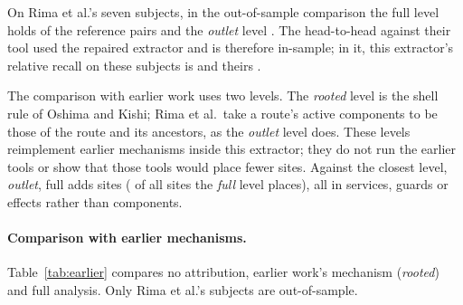 On Rima et al.'s seven subjects, in the out-of-sample comparison the full level holds \RimaHitFull{}
of the \RimaPairs{} reference pairs and the \emph{outlet} level \RimaHitOutlet{}. The head-to-head against their tool
used the repaired extractor and is therefore in-sample; in it, this extractor's relative recall on these subjects is \HHRimaOursRecall{} and theirs \HHRimaTheirsRecall{}.

The comparison with earlier work uses two levels. The \emph{rooted} level is the shell rule of Oshima and Kishi;
Rima et al.\ take a route's active components to be those of the route and its ancestors, as the \emph{outlet} level does. These levels
reimplement earlier mechanisms inside this extractor; they do not run the earlier tools or show
that those tools would place fewer sites. Against the closest level, \emph{outlet}, full adds
\AblationFullAddedSites{} sites (\AblationFullAddedShare{} of all sites the \emph{full} level places), all in services,
guards or effects rather than components.

\paragraph{Comparison with earlier mechanisms.}
\label{sec:res-earlier}

Table~\ref{tab:earlier} compares no attribution, earlier work's mechanism (\emph{rooted}) and full
analysis. Only Rima et al.'s subjects are out-of-sample.

